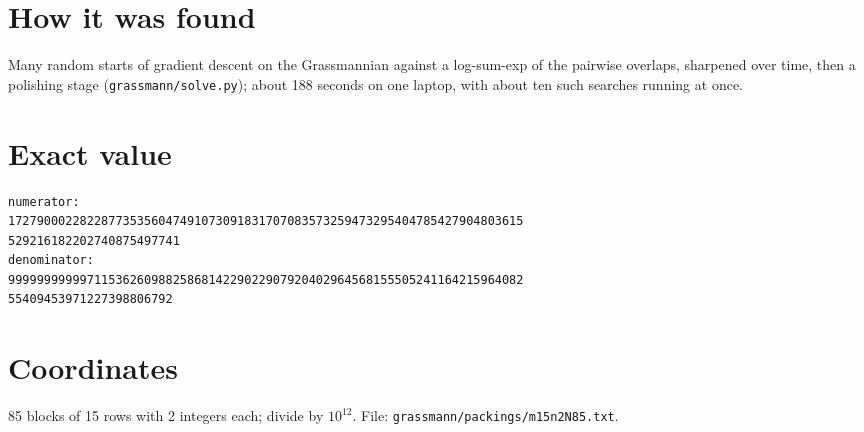 \documentclass[11pt,a4paper]{article}
\begin{document}
\section{How it was found}
Many random starts of gradient descent on the Grassmannian against a log-sum-exp of the pairwise overlaps, sharpened over time, then a polishing stage (\texttt{grassmann/solve.py}); about 188 seconds on one laptop, with about ten such searches running at once.


\appendix
\section{Exact value}
{\small
\begin{verbatim}
numerator:
172790002282287735356047491073091831707083573259473295404785427904803615
529216182202740875497741
denominator:
999999999997115362609882586814229022907920402964568155505241164215964082
55409453971227398806792
\end{verbatim}}

\section{Coordinates}
85 blocks of 15 rows with 2 integers each; divide by $10^{12}$. File: \texttt{grassmann/packings/m15n2N85.txt}.
{\tiny
\begin{multicols}{4}
\end{multicols}}
\end{document}
